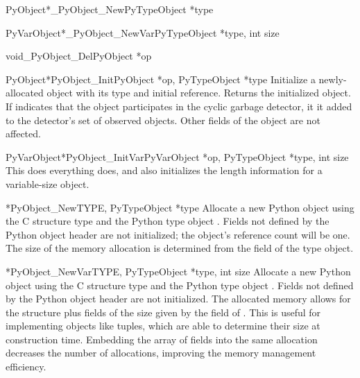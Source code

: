 \documentclass{manual}
\begin{document}
\begin{cfuncdesc}{PyObject*}{_PyObject_New}{PyTypeObject *type}
\end{cfuncdesc}

\begin{cfuncdesc}{PyVarObject*}{_PyObject_NewVar}{PyTypeObject *type, int size}
\end{cfuncdesc}

\begin{cfuncdesc}{void}{_PyObject_Del}{PyObject *op}
\end{cfuncdesc}

\begin{cfuncdesc}{PyObject*}{PyObject_Init}{PyObject *op,
					    PyTypeObject *type}
  Initialize a newly-allocated object  with its type and
  initial reference.  Returns the initialized object.  If 
  indicates that the object participates in the cyclic garbage
  detector, it it added to the detector's set of observed objects.
  Other fields of the object are not affected.
\end{cfuncdesc}

\begin{cfuncdesc}{PyVarObject*}{PyObject_InitVar}{PyVarObject *op,
						  PyTypeObject *type, int size}
  This does everything  does, and also
  initializes the length information for a variable-size object.
\end{cfuncdesc}

\begin{cfuncdesc}{*}{PyObject_New}{TYPE, PyTypeObject *type}
  Allocate a new Python object using the C structure type 
  and the Python type object .  Fields not defined by the
  Python object header are not initialized; the object's reference
  count will be one.  The size of the memory
  allocation is determined from the  field of the
  type object.
\end{cfuncdesc}

\begin{cfuncdesc}{*}{PyObject_NewVar}{TYPE, PyTypeObject *type,
                                                int size}
  Allocate a new Python object using the C structure type 
  and the Python type object .  Fields not defined by the
  Python object header are not initialized.  The allocated memory
  allows for the  structure plus  fields of the
  size given by the  field of .  This is
  useful for implementing objects like tuples, which are able to
  determine their size at construction time.  Embedding the array of
  fields into the same allocation decreases the number of allocations,
  improving the memory management efficiency.
\end{cfuncdesc}
\end{document}
